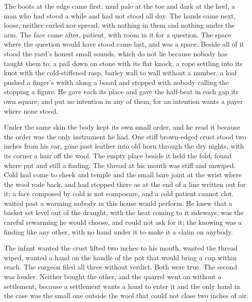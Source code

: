 The boots at the edge came first: mud pale at the toe and dark at the heel, a man who had stood a while and had not stood all day. The hands came next, loose, neither curled nor spread, with nothing in them and nothing under the arm. The face came after, patient, with room in it for a question. The space where the question would have stood came last, and was a space. Beside all of it stood the yard's honest small sounds, which do not lie because nobody has taught them to: a pail down on stone with its flat knock, a rope settling into its knot with the cold-stiffened rasp, barley wall to wall without a number, a loaf pushed a finger's width along a board and stopped with nobody calling the stopping a figure. He gave each its place and gave the half-beat in each gap its own square, and put no intention in any of them, for an intention wants a payer where none stood.

Under the same skin the body kept its own small order, and he read it because the order was the only instrument he had. One stiff brown-edged crust stood two inches from his ear, gone past leather into old horn through the dry nights, with its corner a hair off the wool. The empty place beside it held the fold, found where put and still a finding. The thread at his mouth was stiff and unwiped. Cold had come to cheek and temple and the small bare joint at the wrist where the wool rode back, and had stopped there as at the end of a line written out for it; a face composed by cold is not composure, and a cold patient cannot clot.  waited past a warming nobody in this house would perform. He knew that a basket set level out of the draught, with the heat coming to it sideways, was the careful rewarming he would choose, and could not ask for it; the knowing was a finding like any other, with no hand under it to make it a claim on anybody.

The infant wanted the crust lifted two inches to his mouth, wanted the thread wiped, wanted a hand on the handle of the pot that would bring a cup within reach. The surgeon filed all three without verdict. Both were true. The second was louder. Neither bought the other, and the quarrel went on without a settlement, because a settlement wants a hand to enter it and the only hand in the case was the small one outside the wool that could not close two inches of air.

